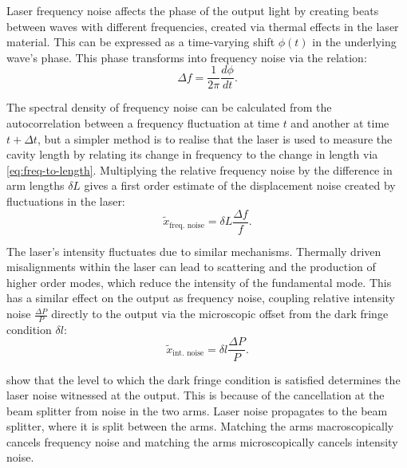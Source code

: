 Laser frequency noise affects the phase of the output light by creating beats between waves with different frequencies, created via thermal effects in the laser material. This can be expressed as a time-varying shift $\phi \left( t \right)$ in the underlying wave's phase. This phase transforms into frequency noise via the relation:
\begin{equation}
  \Delta f = \frac{1}{2 \pi} \frac{d \phi}{dt}.
\end{equation}

The spectral density of frequency noise can be calculated from the autocorrelation between a frequency fluctuation at time $t$ and another at time $t + \Delta t$, but a simpler method is to realise that the laser is used to measure the cavity length by relating its change in frequency to the change in length via \cref{eq:freq-to-length}. Multiplying the relative frequency noise by the difference in arm lengths $\delta L$ gives a first order estimate of the displacement noise created by fluctuations in the laser:
\begin{equation}
  \label{eq:laser-freq-noise}
  \tilde{x}_{\text{freq. noise}} = \delta L \frac{\Delta f}{f}.
\end{equation}

The laser's intensity fluctuates due to similar mechanisms. Thermally driven misalignments within the laser can lead to scattering and the production of higher order modes, which reduce the intensity of the fundamental mode. This has a similar effect on the output as frequency noise, coupling relative intensity noise $\frac{\Delta P}{P}$ directly to the output via the microscopic offset from the dark fringe condition $\delta l$:
\begin{equation}
  \label{eq:laser-int-noise}
  \tilde{x}_{\text{int. noise}} = \delta l \frac{\Delta P}{P}.
\end{equation}

 show that the level to which the dark fringe condition is satisfied determines the laser noise witnessed at the output. This is because of the cancellation at the beam splitter from noise in the two arms. Laser noise propagates to the beam splitter, where it is split between the arms. Matching the arms macroscopically cancels frequency noise and matching the arms microscopically cancels intensity noise.

